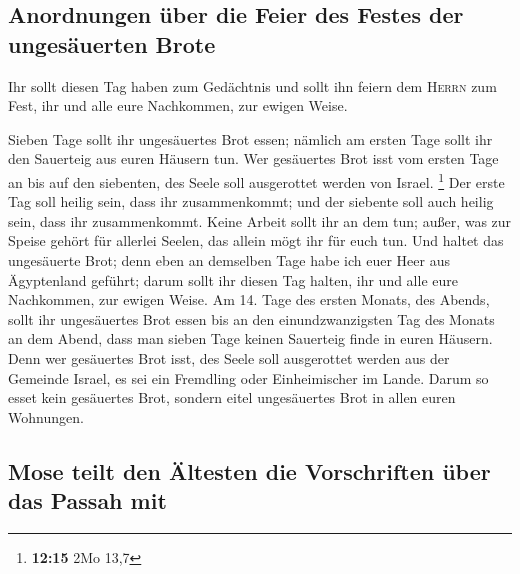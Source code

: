 \hypertarget{anordnungen-uxfcber-die-feier-des-festes-der-ungesuxe4uerten-brote}{%
\subsection{Anordnungen über die Feier des Festes der ungesäuerten
Brote}\label{anordnungen-uxfcber-die-feier-des-festes-der-ungesuxe4uerten-brote}}

 Ihr sollt diesen Tag haben zum Gedächtnis und sollt ihn
feiern dem \textsc{Herrn} zum Fest, ihr und alle eure Nachkommen, zur
ewigen Weise.

 Sieben Tage sollt ihr ungesäuertes Brot essen; nämlich
am ersten Tage sollt ihr den Sauerteig aus euren Häusern tun. Wer
gesäuertes Brot isst vom ersten Tage an bis auf den siebenten, des Seele
soll ausgerottet werden von Israel. \footnote{\textbf{12:15} 2Mo 13,7}
 Der erste Tag soll heilig sein, dass ihr zusammenkommt;
und der siebente soll auch heilig sein, dass ihr zusammenkommt. Keine
Arbeit sollt ihr an dem tun; außer, was zur Speise gehört für allerlei
Seelen, das allein mögt ihr für euch tun.  Und haltet das
ungesäuerte Brot; denn eben an demselben Tage habe ich euer Heer aus
Ägyptenland geführt; darum sollt ihr diesen Tag halten, ihr und alle
eure Nachkommen, zur ewigen Weise.  Am 14. Tage des
ersten Monats, des Abends, sollt ihr ungesäuertes Brot essen bis an den
einundzwanzigsten Tag des Monats an dem Abend,  dass man
sieben Tage keinen Sauerteig finde in euren Häusern. Denn wer gesäuertes
Brot isst, des Seele soll ausgerottet werden aus der Gemeinde Israel, es
sei ein Fremdling oder Einheimischer im Lande.  Darum so
esset kein gesäuertes Brot, sondern eitel ungesäuertes Brot in allen
euren Wohnungen.

\hypertarget{mose-teilt-den-uxe4ltesten-die-vorschriften-uxfcber-das-passah-mit}{%
\subsection{Mose teilt den Ältesten die Vorschriften über das Passah
mit}\label{mose-teilt-den-uxe4ltesten-die-vorschriften-uxfcber-das-passah-mit}}

